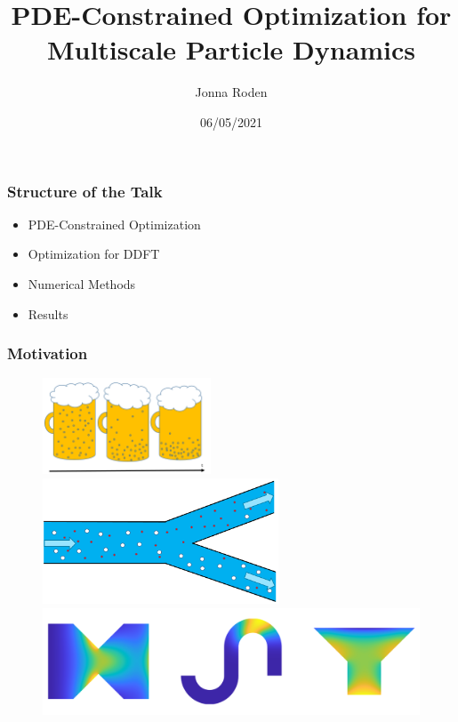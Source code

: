 \documentclass[aspectratio=169,xcolor=dvipsnames]{beamer}
\begin{document}
\title[]{PDE-Constrained Optimization for Multiscale Particle Dynamics}
\author[Jonna Roden]{Jonna Roden}
\date{06/05/2021}

\begin{frame}
\titlepage
\end{frame}
 
 
\begin{frame}
	\frametitle{Structure of the Talk}
	 
	 \begin{itemize}
	 	\item PDE-Constrained Optimization
	 	\item Optimization for DDFT
	 	\item Numerical Methods 
	 	\item Results
	 \end{itemize}
\end{frame}

\begin{frame}
	\frametitle{Motivation}
		\begin{figure}
			\includegraphics[width=5cm]{beer.png}
			\includegraphics[width=7cm]{Microfilter.png}
			\includegraphics[width=12cm]{Future.png}
		\end{figure}
		
\end{frame}
\end{document}
